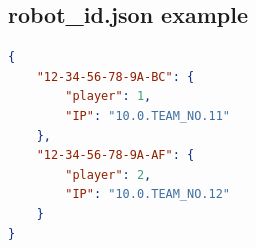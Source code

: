 \subsection{robot\_id.json example}
\label{sec:robotidjson}

\begin{lstlisting}[language=json,firstnumber=1]
{
    "12-34-56-78-9A-BC": {
        "player": 1,
        "IP": "10.0.TEAM_NO.11"
    },
    "12-34-56-78-9A-AF": {
        "player": 2,
        "IP": "10.0.TEAM_NO.12"
    }
}
\end{lstlisting}